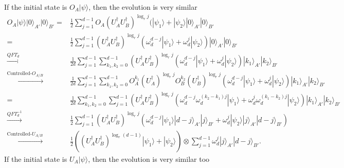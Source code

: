 \documentclass[11pt,letterpaper]{article}
\newcommand{\ket}[1]{|#1\rangle}
\newcommand{\x}{\otimes}
\newcommand{\ct}{^{\dagger}}
\newcommand{\1}{\mathbb{1}}
\theoremstyle{definition}
\begin{document}
	
If the initial state is $O_A\ket{\psi}$, then the evolution is very similar 
\begin{align}
	O_A \ket{\psi} \ket{0}_{A'}\ket{0}_{B'} =&  
		\frac{1}{2} \sum_{j=1}^{d-1} O_A(U_A\ct U_B\ct)^{\log_r j}(\ket{\psi_1}+\ket{\psi_2} \ket{0}_{A'}\ket{0}_{B'}\\
		=&\frac{1}{2}\sum_{j=1}^{d-1}(U_A\ct U_B\ct)^{\log_r j} (\omega_d^{d-j} \ket{\psi_1} + \omega_d^j \ket{\psi_2}) \ket{0}_{A'}\ket{0}_{B'}\\
		\xrightarrow[]{QFT_d} &\frac{1}{2d}\sum_{j=1}^{d-1} \sum_{k_1,k_2 = 0}^{d-1}(U_A\ct U_B\ct)^{\log_r j} (\omega_d^{d-j} \ket{\psi_1} + \omega_d^j \ket{\psi_2})  \ket{k_1}_{A'}\ket{k_2}_{B'}\\
		\xrightarrow[]{\text{Controlled-}O_{A/B}}&\frac{1}{2d}\sum_{j=1}^{d-1}\sum_{k_1,k_2 = 0}^{d-1} 
		 O_A^{k_1}(U_A\ct)^{\log_r j} O_B^{k_2}(U_B\ct)^{\log_r j} (\omega_d^{d-j} \ket{\psi_1} + \omega_d^j \ket{\psi_2}) \ket{k_1}_{A'}\ket{k_2}_{B'}\\
		=& \frac{1}{2d}\sum_{k_1,k_2 = 0}^{d-1} \sum_{j=1}^{d-1} (U_A\ct U_B\ct)^{\log_r j}
		(\omega_d^{d-j}\omega_d^{(k_2-k_1)j}\ket{\psi_1}
		+\omega_d^j \omega_d^{(k_1-k_2)j} \ket{\psi_2})
		 \ket{k_1}_{A'}\ket{k_2}_{B'}\\
		\xrightarrow[]{QFT_d^{-1}}& \frac{1}{2} \sum_{j=1}^{d-1}  (U_A\ct U_B\ct)^{\log_r j}  
		(\omega_d^{d-j}\ket{\psi_1} \ket{d-j}_{A'}\ket{j}_{B'}
		+ \omega_d^j \ket{\psi_2} \ket{j}_{A'} \ket{d-j}_{B'})\\
		\xrightarrow[]{\text{Controlled-}U_{A/B}}&  \frac{1}{2} ((U_A\ct U_B\ct)^{\log_r(d-1)} \ket{\psi_1}+\ket{\psi_2}) \x  
		\sum_{j=1}^{d-1} \omega_d^{j}\ket{j}_{A'}\ket{d-j}_{B'}.
\end{align}
If the initial state is $U_A\ket{\psi}$, then the evolution is very similar too
\end{document}
